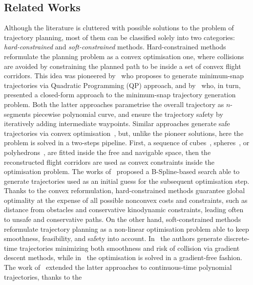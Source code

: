 \subsection{Related Works}
Although the literature is cluttered with possible solutions to the problem of trajectory planning, most of them can be classified
solely into two categories: \emph{hard-constrained} and \emph{soft-constrained} methods.
Hard-constrained methods reformulate the planning problem as a convex optimisation one, where collisions are avoided by constraining
the planned path to be inside a set of convex flight corridors.
This idea was pioneered by~\cite{mellinger2011minimum} who proposes to generate minimum-snap trajectories
via Quadratic Programming (QP) approach, and by~\cite{richter2016polynomial} who, in turn, presented a closed-form approach
to the minimum-snap trajectory generation problem.
Both the latter approaches parametrise the overall trajectory as $n$-segments piecewise polynomial curve,
and ensure the trajectory safety by iteratively adding intermediate waypoints.
Similar approaches generate safe trajectories via convex optimisation~\cite{chen2015real, gao2016online, liu2017planning, ding2018trajectory, ding2019efficient, gao2018online},
but, unlike the pioneer solutions, here the problem is solved in a two-steps pipeline. First, a sequence of cubes~\cite{gao2018online},
spheres~\cite{gao2019flying}, or polyhedrons~\cite{liu2017planning}, are fitted inside the free and navigable space, then the
reconstructed flight corridors are used as convex constraints inside the optimisation problem.
The works of~\cite{ding2018trajectory, ding2019efficient} proposed a B-Spline-based search able to generate trajectories used as 
an initial guess for the subsequent optimisation step.
Thanks to the convex reformulation, hard-constrained methods guarantee global optimality at the expense of all possible nonconvex
costs and constraints, such as distance from obstacles and conservative kinodynamic constraints, leading often to unsafe and
conservative paths.
On the other hand, soft-constrained methods reformulate trajectory planning as a non-linear optimisation problem able to keep
smoothness, feasibility, and safety into account.
In~\cite{zucker2013chomp} the authors generate discrete-time trajectories minimizing both smoothness and risk of collision via
gradient descent methods, while in~\cite{kalakrishnan2011stomp} the optimisation is solved in a gradient-free fashion.
The work of~\cite{oleynikova2016continuous} extended the latter approaches to continuous-time polynomial trajectories, thanks to the
